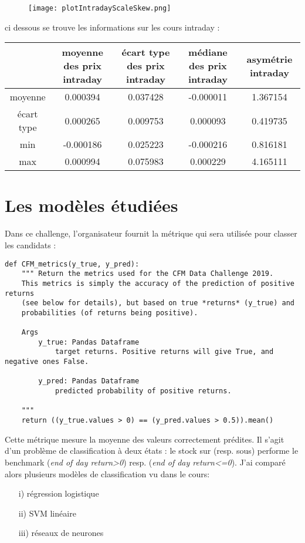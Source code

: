 \documentclass[12pt]{scrartcl} %
\begin{document}
\newline
\begin{figure}[h!]
\centering
\texttt{[image: plotIntradayScaleSkew.png]}
\end{figure}
\newline
ci dessous se trouve les informations sur les cours intraday : 
\begin{table}[h!]
\centering
\begin{adjustbox}{max width=\textwidth}
\begin{tabular}{|c|c|c|c|c|}
& moyenne des prix intraday & écart type des prix intraday & médiane des prix intraday & asymétrie intraday\\
\hline
moyenne & 0.000394 & 0.037428 & -0.000011 & 1.367154\\
écart type & 0.000265 &  0.009753 &  0.000093 & 0.419735 \\
min & -0.000186 & 0.025223 &  -0.000216 & 0.816181\\
max & 0.000994 & 0.075983 & 0.000229 & 4.165111
\end{tabular}
\end{adjustbox}
\end{table}
\section{Les modèles étudiées}
Dans ce challenge, l'organisateur fournit la métrique qui sera utilisée pour classer les candidats : 
\begin{verbatim}
def CFM_metrics(y_true, y_pred):
	"""	Return the metrics used for the CFM Data Challenge 2019.
    This metrics is simply the accuracy of the prediction of positive 	returns
    (see below for details), but based on true *returns* (y_true) and
    probabilities (of returns being positive).

    Args
        y_true: Pandas Dataframe
            target returns. Positive returns will give True, and negative ones False.

        y_pred: Pandas Dataframe
            predicted probability of positive returns.

    """
    return ((y_true.values > 0) == (y_pred.values > 0.5)).mean()
\end{verbatim}
Cette métrique mesure la moyenne des valeurs correctement prédites. Il s'agit d'un problème de classification à deux états : le stock sur (resp. sous) performe le benchmark (\textit{end of day return>0}) resp. (\textit{end of day return<=0}). J'ai comparé alors plusieurs modèles de classification vu dans le cours:
\begin{itemize}
\item[i)] régression logistique
\item[ii)] SVM linéaire
\item[iii)] réseaux de neurones
\end{itemize}
\end{document}
